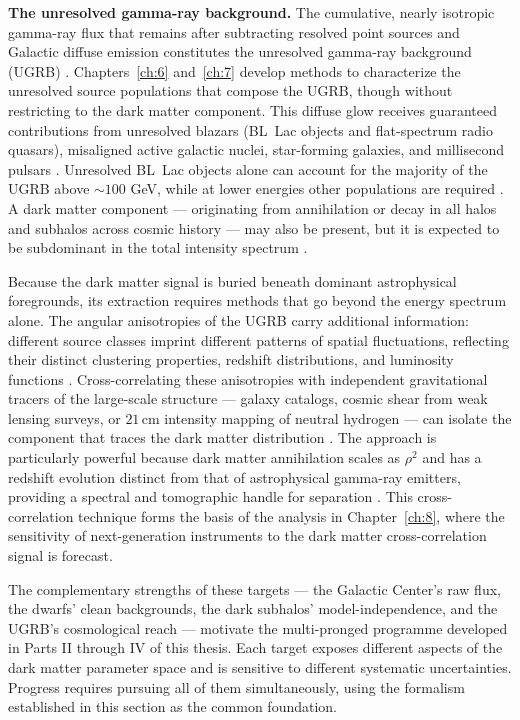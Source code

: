 \textbf{The unresolved gamma-ray background.}
The cumulative, nearly isotropic gamma-ray flux that remains after subtracting resolved point sources and Galactic diffuse emission constitutes the unresolved gamma-ray background (UGRB) \cite{DGRB-review}.
Chapters~\ref{ch:6} and~\ref{ch:7} develop methods to characterize the unresolved source populations that compose the UGRB, though without restricting to the dark matter component.
This diffuse glow receives guaranteed contributions from unresolved blazars (BL~Lac objects and flat-spectrum radio quasars), misaligned active galactic nuclei, star-forming galaxies, and millisecond pulsars \cite{DGRB-review}.
Unresolved BL~Lac objects alone can account for the majority of the UGRB above $\sim 100$ GeV, while at lower energies other populations are required \cite{DGRB-review}.
A dark matter component --- originating from annihilation or decay in all halos and subhalos across cosmic history --- may also be present, but it is expected to be subdominant in the total intensity spectrum \cite{DGRB-review,Cirelli:2024ssz}.

Because the dark matter signal is buried beneath dominant astrophysical foregrounds, its extraction requires methods that go beyond the energy spectrum alone.
The angular anisotropies of the UGRB carry additional information: different source classes imprint different patterns of spatial fluctuations, reflecting their distinct clustering properties, redshift distributions, and luminosity functions \cite{DGRB-review}.
Cross-correlating these anisotropies with independent gravitational tracers of the large-scale structure --- galaxy catalogs, cosmic shear from weak lensing surveys, or $21\,$cm intensity mapping of neutral hydrogen --- can isolate the component that traces the dark matter distribution \cite{DGRB-review,Pinetti:2021jjs,Cirelli:2024ssz}.
The approach is particularly powerful because dark matter annihilation scales as $\rho^2$ and has a redshift evolution distinct from that of astrophysical gamma-ray emitters, providing a spectral and tomographic handle for separation \cite{Pinetti:2021jjs}.
This cross-correlation technique forms the basis of the analysis in Chapter~\ref{ch:8}, where the sensitivity of next-generation instruments to the dark matter cross-correlation signal is forecast.

The complementary strengths of these targets --- the Galactic Center's raw flux, the dwarfs' clean backgrounds, the dark subhalos' model-independence, and the UGRB's cosmological reach --- motivate the multi-pronged programme developed in Parts II through IV of this thesis.
Each target exposes different aspects of the dark matter parameter space and is sensitive to different systematic uncertainties.
Progress requires pursuing all of them simultaneously, using the formalism established in this section as the common foundation.

